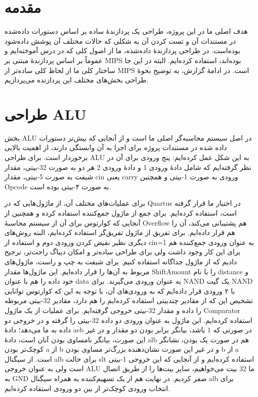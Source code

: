 \documentclass[12pt,titlepage,a4page , tikz , multi,table , svgnames,xcdraw]{article}
\begin{document}
\newpage
\pagestyle{fancy}
\fancyhf{}
\fancyfoot{}

\cfoot{\thepage}



\newpage

\section{مقدمه}

هدف اصلی ما در این پروژه، طراحی یک پردازندهٔ ساده بر اساس دستورات داده‌شده در مستندات آن و تست کردن آن به شکلی که حالات مختلف آن پوشش داده‌شود بوده‌است. در طراحی پردازندهٔ داده‌شده، ما از اصول کلی که در درس آموخته‌ایم و عموماً بر اساس پردازندهٔ مبتنی بر MIPS بوده‌اند، استفاده کرده‌ایم. البته در این جا ساختار کلی ما از لحاظ کلی ساده‌تر از MIPS است. در ادامهٔ گزارش، به توضیح نحوهٔ طراحی بخش‌های مختلف این پردازنده می‌پردازیم.

\newpage

\section{طراحی ALU}

بخش ALU در اصل سیستم محاسبه‌گر اصلی ما است و از آنجایی که بیش‌تر دستورات داده شده در مستندات پروژه برای اجرا به آن وابستگی دارند، از اهمیت بالایی برخوردار است. برای طراحی ALU به این شکل عمل کرده‌ایم: پنج ورودی برای آن در نظر گرفته‌ایم که شامل دادهٔ ورودی 1 و دادهٔ ورودی 2 هر دو به صورت 32-بیتی، مقدار شیفت به صورت 5-بیتی، مقدار cin یعنی carry ورودی به صورت 1-بیتی و همچنین Opcode به صورت ۴-بیتی بوده است. 

برای عملیات‌های مختلف آن، از ماژول‌هایی که در Quartus در اختیار ما قرار گرفته است، استفاده کرده‌ایم. برای جمع از ماژول جمع‌کننده استفاده کرده و همچنین از آنجایی که کوارتوس برای آن از سیستم محاسبهٔ Overflow هم پشتیبانی می‌کند، آن را هم قرار داده‌ایم. برای تفریق از ماژول تفریق‌گر استفاده کرده‌ایم، البته روش‌های دیگری نظیر نقیض کردن ورودی دوم و استفاده از cin=1 به عنوان ورودی جمع‌کننده هم برای این کار وجود داشت ولی برای طراحی ساده‌تر و امکان دیباگ راحت‌تر، ترجیح دادیم که از ماژول جداگانه استفاده کنیم. برای شیفت به چپ و راست، ماژول‌های مربوط به آن‌ها را قرار داده‌ایم. این ماژول‌ها مقدار ShiftAmount را با نام distance و خود داده را هم با عنوان data به عنوان ورودی می‌گیرند. برای NAND یک گیت NAND با ۲ ورودی قرار داده‌ایم که به ورودی‌های آن، با توجه به این که کوارتوس توانایی تشخیص این که از مقادیر چندبیتی استفاده کرده‌ایم را هم دارد، مقادیر 32-بیتی مربوطه را داده و مقدار 32-بیتی خروجی گرفته‌ایم. برای عملیات  از یک ماژول Comparator استفاده کرده‌ایم. این ماژول به عنوان ورودی دو داده 32-بیتی را گرفته و در خروجی دو داده به ما می‌دهد؛ دادهٔ aeb در صورتی که $1$ باشد، بیانگر برابر بودن دو مقدار و در غیر این صورت، بیانگر نامساوی بودن آنان است، دادهٔ alb هم در صورت یک بودن، نشانگر کوچک‌تر بودن a از b و در غیر این صورت نشان‌دهنده بزرگ‌تر مساوی بودن b از a است. از سیگنال alb برای حالت slt استفاده کرده‌ایم و از آنجایی که این خروجی 1-بیتی است ولی به عنوان خروجی ALU ما 32 بیت می‌خواهیم، سایر بیت‌ها را از طریق اتصال به GND صفر کردیم. در نهایت هم از یک تسهیم‌کننده به همراه سیگنال alb برای انتخاب ورودی کوچک‌تر از بین دو ورودی استفاده کرده‌ایم.
\end{document}
